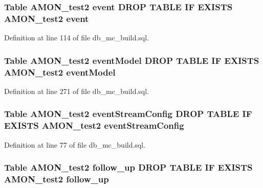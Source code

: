 \hypertarget{db__mc__build_8sql_a53de2cc91ad7a64a91aeecf1826683b7}{
\subsubsection[{event}]{\setlength{\rightskip}{0pt plus 5cm}Table {\bf A\-M\-O\-N\-\_\-test2} event D\-R\-O\-P T\-A\-B\-L\-E I\-F E\-X\-I\-S\-T\-S {\bf A\-M\-O\-N\-\_\-test2} event}}\label{db__mc__build_8sql_a53de2cc91ad7a64a91aeecf1826683b7}


Definition at line 114 of file db\-\_\-mc\-\_\-build.\-sql.

\hypertarget{db__mc__build_8sql_a032bb0b30507dcbea95be4589098a90a}{
\subsubsection[{event\-Model}]{\setlength{\rightskip}{0pt plus 5cm}Table {\bf A\-M\-O\-N\-\_\-test2} event\-Model D\-R\-O\-P T\-A\-B\-L\-E I\-F E\-X\-I\-S\-T\-S {\bf A\-M\-O\-N\-\_\-test2} event\-Model}}\label{db__mc__build_8sql_a032bb0b30507dcbea95be4589098a90a}


Definition at line 271 of file db\-\_\-mc\-\_\-build.\-sql.

\hypertarget{db__mc__build_8sql_a1604519dea42a59ed881eee0de86ba38}{
\subsubsection[{event\-Stream\-Config}]{\setlength{\rightskip}{0pt plus 5cm}Table {\bf A\-M\-O\-N\-\_\-test2} event\-Stream\-Config D\-R\-O\-P T\-A\-B\-L\-E I\-F E\-X\-I\-S\-T\-S {\bf A\-M\-O\-N\-\_\-test2} event\-Stream\-Config}}\label{db__mc__build_8sql_a1604519dea42a59ed881eee0de86ba38}


Definition at line 77 of file db\-\_\-mc\-\_\-build.\-sql.

\hypertarget{db__mc__build_8sql_a03112b3e5b52253e85f8e8d3797c13e8}{
\subsubsection[{follow\-\_\-up}]{\setlength{\rightskip}{0pt plus 5cm}Table {\bf A\-M\-O\-N\-\_\-test2} follow\-\_\-up D\-R\-O\-P T\-A\-B\-L\-E I\-F E\-X\-I\-S\-T\-S {\bf A\-M\-O\-N\-\_\-test2} follow\-\_\-up}}\label{db__mc__build_8sql_a03112b3e5b52253e85f8e8d3797c13e8}


